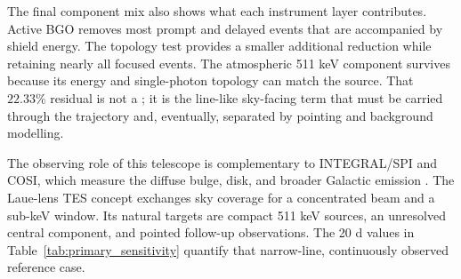 \documentclass[11pt]{article}
\begin{document}
The final component mix also shows what each instrument layer contributes. Active
BGO removes most prompt and delayed events that are accompanied by shield energy.
The topology test provides a smaller additional reduction while retaining nearly
all focused events. The atmospheric 511 keV component survives because its energy
and single-photon topology can match the source. That $22.33\%$ residual is not a
; it is the line-like sky-facing term that must be carried
through the trajectory and, eventually, separated by pointing and background
modelling.

The observing role of this telescope is complementary to INTEGRAL/SPI and COSI,
which measure the diffuse bulge, disk, and broader Galactic emission
\cite{Siegert2016AA,Kierans2020,Siegert2020COSI,Yoneda2025,Karwin2023}.
The Laue-lens TES concept exchanges sky coverage for a concentrated beam and a
sub-keV window. Its natural targets are compact 511 keV sources, an unresolved
central component, and pointed follow-up observations. The 20 d values in
Table~\ref{tab:primary_sensitivity} quantify that narrow-line, continuously
observed reference case.

\subsection{}
\label{subsec:limitations}
\end{document}
